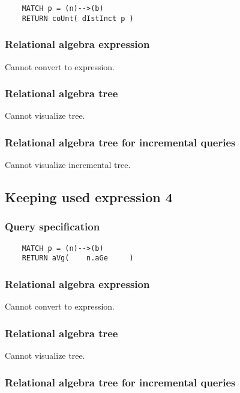 	\begin{lstlisting}
	MATCH p = (n)-->(b)
	RETURN coUnt( dIstInct p )
	\end{lstlisting}


	\subsubsection*{Relational algebra expression}

	Cannot convert to expression.

	\subsubsection*{Relational algebra tree}

	Cannot visualize tree.

	\subsubsection*{Relational algebra tree for incremental queries}

	Cannot visualize incremental tree.
	\subsection{Keeping used expression 4}

	\subsubsection*{Query specification}

	\begin{lstlisting}
	MATCH p = (n)-->(b)
	RETURN aVg(    n.aGe     )
	\end{lstlisting}


	\subsubsection*{Relational algebra expression}

	Cannot convert to expression.

	\subsubsection*{Relational algebra tree}

	Cannot visualize tree.

	\subsubsection*{Relational algebra tree for incremental queries}

